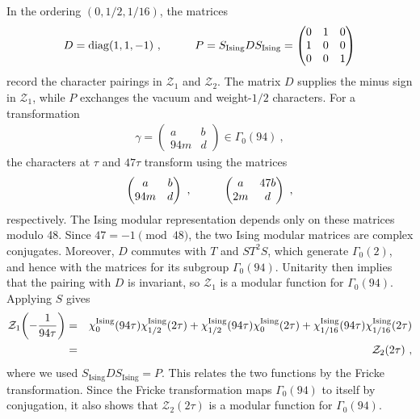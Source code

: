 \documentclass[12pt]{article}
\numberwithin{equation}{section}
\newcommand{\bea}{\begin{eqnarray}}
\newcommand{\eea}{\end{eqnarray}}
\def\no{\nonumber}
\theoremstyle{remark}
\begin{document}
In the ordering $(0,1/2,1/16)$, the matrices
\bea
D=\mathrm{diag}(1,1,-1)~,\hspace{0.4 in}
P=S_{\mathrm{Ising}}DS_{\mathrm{Ising}}=
\begin{pmatrix}
0&1&0\\
1&0&0\\
0&0&1
\end{pmatrix}
\eea
record the character pairings in $\mathcal Z_1$ and $\mathcal Z_2$. The matrix $D$ supplies the minus sign in $\mathcal Z_1$, while $P$ exchanges the vacuum and weight-$1/2$ characters.
For a transformation
\bea
\gamma=\begin{pmatrix}a&b\\94m&d\end{pmatrix}\in\Gamma_0(94)~,
\eea
the characters at $\tau$ and $47\tau$ transform using the matrices
\bea
\begin{pmatrix}a&b\\94m&d\end{pmatrix}~,\hspace{0.4 in}
\begin{pmatrix}a&47b\\2m&d\end{pmatrix}~,
\eea
respectively. The Ising modular representation depends only on these matrices modulo 48. Since $47=-1\pmod{48}$, the two Ising modular matrices are complex conjugates. Moreover, $D$ commutes with $T$ and $ST^2S$, which generate $\Gamma_0(2)$, and hence with the matrices for its subgroup $\Gamma_0(94)$. Unitarity then implies that the pairing with $D$ is invariant, so $\mathcal Z_1$ is a modular function for $\Gamma_0(94)$.
Applying $S$ gives
\bea
\mathcal Z_1\!\left(-{1\over94\tau}\right)
&=&\chi^{\mathrm{Ising}}_0(94\tau)\chi^{\mathrm{Ising}}_{1/2}(2\tau)+\chi^{\mathrm{Ising}}_{1/2}(94\tau)\chi^{\mathrm{Ising}}_0(2\tau)+\chi^{\mathrm{Ising}}_{1/16}(94\tau)\chi^{\mathrm{Ising}}_{1/16}(2\tau)\no\\
&=&\mathcal Z_2(2\tau)~,
\eea
where we used $S_{\mathrm{Ising}}DS_{\mathrm{Ising}}=P$. This relates the two functions by the Fricke transformation. Since the Fricke transformation maps $\Gamma_0(94)$ to itself by conjugation, it also shows that $\mathcal Z_2(2\tau)$ is a modular function for $\Gamma_0(94)$.
\end{document}
